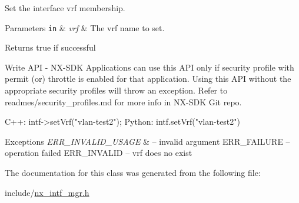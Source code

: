 Set the interface vrf membership. 
\begin{DoxyParams}[1]{Parameters}
\mbox{\tt in}  & {\em vrf} & The vrf name to set. \\
\hline
\end{DoxyParams}
\begin{DoxyReturn}{Returns}
true if successful
\end{DoxyReturn}
\begin{DoxyVerb}Write API - NX-SDK Applications can use this API only if security profile with permit (or) throttle is 
            enabled for that application. Using this API without the appropriate security profiles will
            throw an exception. Refer to readmes/security_profiles.md for more info in NX-SDK Git repo.
\end{DoxyVerb}



\begin{DoxyCode}
C++:
   intf->setVrf(\textcolor{stringliteral}{"vlan-test2"});
Python:
   intf.setVrf(\textcolor{stringliteral}{"vlan-test2"})
\end{DoxyCode}



\begin{DoxyExceptions}{Exceptions}
{\em E\+R\+R\+\_\+\+I\+N\+V\+A\+L\+I\+D\+\_\+\+U\+S\+A\+GE} & -- invalid argument E\+R\+R\+\_\+\+F\+A\+I\+L\+U\+RE -- operation failed E\+R\+R\+\_\+\+I\+N\+V\+A\+L\+ID -- vrf does no exist \\
\hline
\end{DoxyExceptions}


The documentation for this class was generated from the following file\+:\begin{DoxyCompactItemize}
\item 
include/\mbox{\hyperlink{nx__intf__mgr_8h}{nx\+\_\+intf\+\_\+mgr.\+h}}\end{DoxyCompactItemize}
